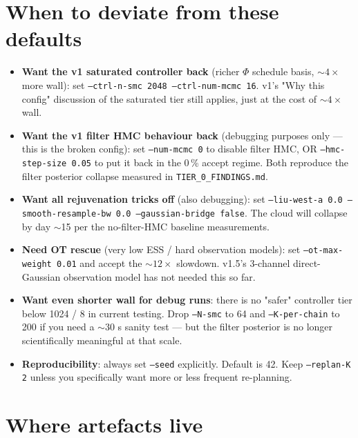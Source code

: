 \documentclass[11pt,a4paper]{article}
\begin{document}
\section{When to deviate from these defaults}
\label{sec:deviate}

\begin{itemize}[leftmargin=*, itemsep=2pt]
\item \textbf{Want the v1 saturated controller back} (richer
$\Phi$ schedule basis, $\sim 4\times$ more wall): set
\texttt{--ctrl-n-smc 2048 --ctrl-num-mcmc 16}. v1's "Why this config"
discussion of the saturated tier still applies, just at the cost
of $\sim 4\times$ wall.

\item \textbf{Want the v1 filter HMC behaviour back} (debugging
purposes only --- this is the broken config): set
\texttt{--num-mcmc 0} to disable filter HMC, OR
\texttt{--hmc-step-size 0.05} to put it back in the 0\,\% accept
regime. Both reproduce the filter posterior collapse measured in
\texttt{TIER\_0\_FINDINGS.md}.

\item \textbf{Want all rejuvenation tricks off} (also debugging):
set \texttt{--liu-west-a 0.0 --smooth-resample-bw 0.0
--gaussian-bridge false}. The cloud will collapse by day $\sim$15
per the no-filter-HMC baseline measurements.

\item \textbf{Need OT rescue} (very low ESS / hard observation
models): set \texttt{--ot-max-weight 0.01} and accept the
$\sim 12\times$ slowdown. v1.5's 3-channel direct-Gaussian
observation model has not needed this so far.

\item \textbf{Want even shorter wall for debug runs}: there is no
"safer" controller tier below 1024 / 8 in current testing. Drop
\texttt{--N-smc} to 64 and \texttt{--K-per-chain} to 200 if
you need a $\sim 30$ s sanity test --- but the filter posterior
is no longer scientifically meaningful at that scale.

\item \textbf{Reproducibility}: always set \texttt{--seed} explicitly.
Default is 42. Keep \texttt{--replan-K 2} unless you specifically
want more or less frequent re-planning.
\end{itemize}


\section{Where artefacts live}
\label{sec:artefacts}
\end{document}
